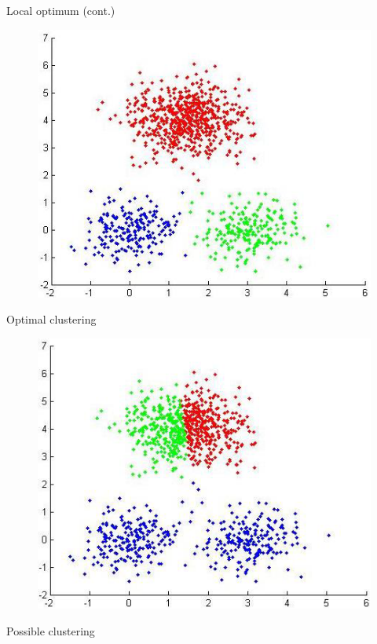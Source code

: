 \documentclass[serif, aspectratio=169]{beamer}
\begin{document}
\begin{frame}{Local optimum (cont.)}
    \begin{minipage}{0.5\textwidth}
        \begin{figure}
            \centering
            \includegraphics[scale=0.55]{pic/optimal_clustering.png}
        \end{figure}
        \vfill
        \begin{center}
            Optimal clustering
        \end{center}
    \end{minipage}%
    \begin{minipage}{0.5\textwidth}
        \begin{figure}
            \centering
            \includegraphics[scale=0.55]{pic/possible_clustering.png}
        \end{figure}
        \vfill
        \begin{center}
            Possible clustering
        \end{center}
    \end{minipage}
\end{frame}
\end{document}
